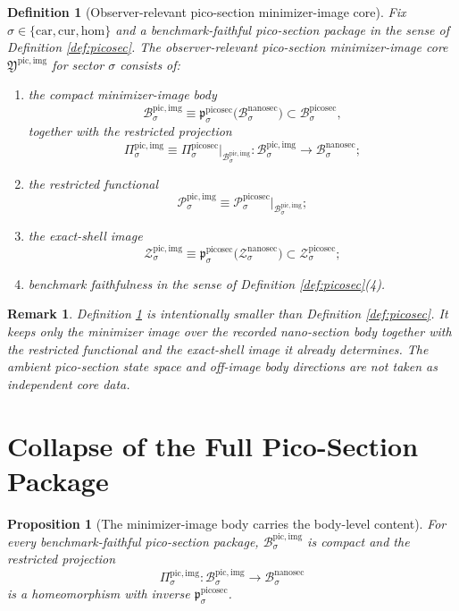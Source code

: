 \documentclass[11pt]{article}
\newcommand{\Car}{\mathrm{car}}
\newcommand{\Cur}{\mathrm{cur}}
\newcommand{\Hom}{\mathrm{hom}}
\newcommand{\NanoSectionBody}[1]{\mathcal B_{#1}^{\mathrm{nanosec}}}
\newcommand{\NanoSectionShell}[1]{\mathcal Z_{#1}^{\mathrm{nanosec}}}
\newcommand{\PicoSectionBody}[1]{\mathcal B_{#1}^{\mathrm{picosec}}}
\newcommand{\PicoSectionProj}[1]{\Pi_{#1}^{\mathrm{picosec}}}
\newcommand{\PicoSectionNanoMin}[1]{\mathfrak p_{#1}^{\mathrm{picosec}}}
\newcommand{\PicoSectionFunctional}[1]{\mathscr P_{#1}^{\mathrm{picosec}}}
\newcommand{\PicoSectionShell}[1]{\mathcal Z_{#1}^{\mathrm{picosec}}}
\newcommand{\PicoImageCore}{\mathfrak Y^{\mathrm{pic,img}}}
\newcommand{\PicoImgBody}[1]{\mathcal B_{#1}^{\mathrm{pic,img}}}
\newcommand{\PicoImgProj}[1]{\Pi_{#1}^{\mathrm{pic,img}}}
\newcommand{\PicoImgFunctional}[1]{\mathscr P_{#1}^{\mathrm{pic,img}}}
\newcommand{\PicoImgShell}[1]{\mathcal Z_{#1}^{\mathrm{pic,img}}}
\newtheorem{definition}{Definition}
\newtheorem{proposition}{Proposition}
\newtheorem{remark}{Remark}
\begin{document}
\begin{definition}[Observer-relevant pico-section minimizer-image core]
\label{def:imagecore}
Fix \(\sigma\in\{\Car,\Cur,\Hom\}\) and a benchmark-faithful pico-section package in the sense of Definition \ref{def:picosec}. The \emph{observer-relevant pico-section minimizer-image core} \(\PicoImageCore\) for sector \(\sigma\) consists of:
\begin{enumerate}
    \item the compact minimizer-image body
    \[
    \PicoImgBody{\sigma}
    \equiv
    \PicoSectionNanoMin{\sigma}\bigl(\NanoSectionBody{\sigma}\bigr)
    \subset
    \PicoSectionBody{\sigma},
    \]
    together with the restricted projection
    \[
    \PicoImgProj{\sigma}
    \equiv
    \PicoSectionProj{\sigma}\big|_{\PicoImgBody{\sigma}}
    :
    \PicoImgBody{\sigma}\to\NanoSectionBody{\sigma};
    \]
    \item the restricted functional
    \[
    \PicoImgFunctional{\sigma}
    \equiv
    \PicoSectionFunctional{\sigma}\big|_{\PicoImgBody{\sigma}};
    \]
    \item the exact-shell image
    \[
    \PicoImgShell{\sigma}
    \equiv
    \PicoSectionNanoMin{\sigma}\bigl(\NanoSectionShell{\sigma}\bigr)
    \subset
    \PicoSectionShell{\sigma};
    \]
    \item benchmark faithfulness in the sense of Definition \ref{def:picosec}(4).
\end{enumerate}
\end{definition}

\begin{remark}
Definition \ref{def:imagecore} is intentionally smaller than Definition \ref{def:picosec}. It keeps only the minimizer image over the recorded nano-section body together with the restricted functional and the exact-shell image it already determines. The ambient pico-section state space and off-image body directions are not taken as independent core data.
\end{remark}

\section{Collapse of the Full Pico-Section Package}

\begin{proposition}[The minimizer-image body carries the body-level content]
\label{prop:body}
For every benchmark-faithful pico-section package, \(\PicoImgBody{\sigma}\) is compact and the restricted projection
\[
\PicoImgProj{\sigma}:\PicoImgBody{\sigma}\to\NanoSectionBody{\sigma}
\]
is a homeomorphism with inverse \(\PicoSectionNanoMin{\sigma}\).
\end{proposition}
\end{document}
